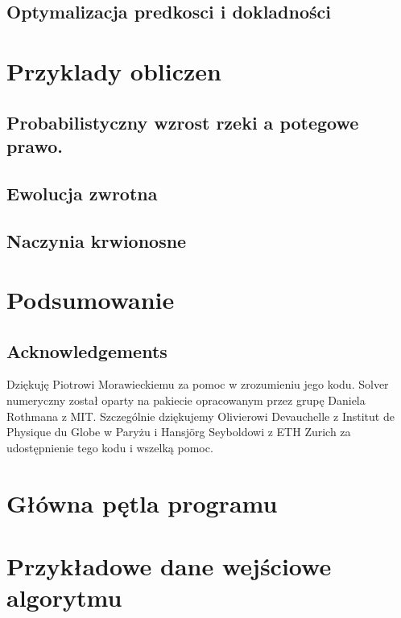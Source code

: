 \documentclass[]{pracamgr}
\begin{document}
    \section{Optymalizacja predkosci i dokladności}



  \chapter{Przyklady obliczen}
    \section{Probabilistyczny wzrost rzeki a potegowe prawo.}
    \section{Ewolucja zwrotna}
    \section{Naczynia krwionosne}

  \chapter{Podsumowanie}

  \section*{Acknowledgements}
    Dziękuję Piotrowi Morawieckiemu za pomoc w zrozumieniu jego kodu. Solver numeryczny został oparty na pakiecie opracowanym przez grupę Daniela Rothmana z MIT. Szczególnie dziękujemy Olivierowi Devauchelle z Institut de Physique du Globe w Paryżu i Hansj\"{o}rg Seyboldowi z ETH Zurich za udostępnienie tego kodu i wszelką pomoc.

  

  \appendix

  \chapter{Główna pętla programu}

  \chapter{Przykładowe dane wejściowe algorytmu}
\end{document}
